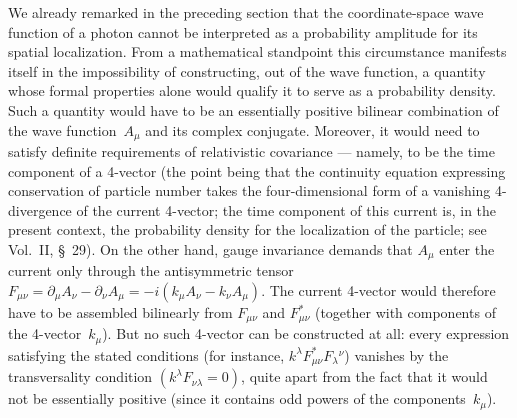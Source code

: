 We already remarked in the preceding section that the coordinate-space wave function of a photon cannot be interpreted as a probability amplitude for its spatial localization. From a mathematical standpoint this circumstance manifests itself in the impossibility of constructing, out of the wave function, a quantity whose formal properties alone would qualify it to serve as a probability density. Such a quantity would have to be an essentially positive bilinear combination of the wave function~$A_\mu$ and its complex conjugate. Moreover, it would need to satisfy definite requirements of relativistic covariance --- namely, to be the time component of a 4-vector (the point being that the continuity equation expressing conservation of particle number takes the four-dimensional form of a vanishing 4-divergence of the current 4-vector; the time component of this current is, in the present context, the probability density for the localization of the particle; see Vol.~II, \S~29). On the other hand, gauge invariance demands that $A_\mu$ enter the current only through the antisymmetric tensor $F_{\mu\nu} = \partial_\mu A_\nu - \partial_\nu A_\mu = -i(k_\mu A_\nu - k_\nu A_\mu)$. The current 4-vector would therefore have to be assembled bilinearly from $F_{\mu\nu}$ and $F^*_{\mu\nu}$ (together with components of the 4-vector~$k_\mu$). But no such 4-vector can be constructed at all: every expression satisfying the stated conditions (for instance, $k^\lambda F^*_{\mu\nu} F_\lambda{}^\nu$) vanishes by the transversality condition $(k^\lambda F_{\nu\lambda} = 0)$, quite apart from the fact that it would not be essentially positive (since it contains odd powers of the components~$k_\mu$).
